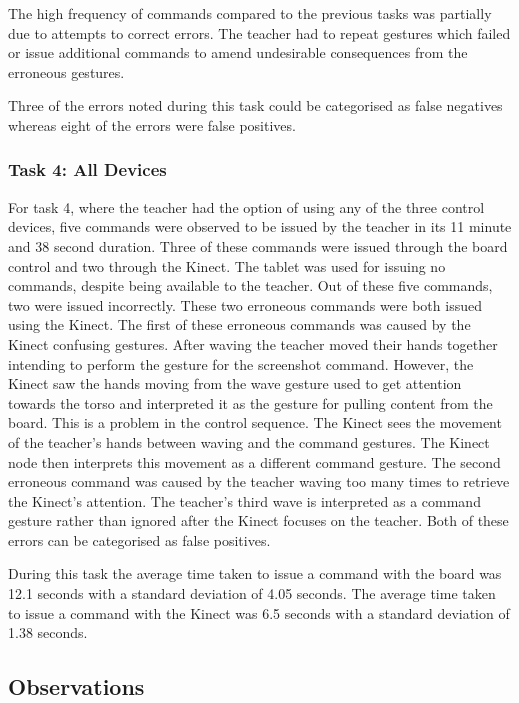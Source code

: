 \documentclass[link]{IWCOMP}
\begin{document}
The high frequency of commands compared to the previous tasks was partially due to attempts to correct errors.
The teacher had to repeat gestures which failed or issue additional commands to amend undesirable consequences from the erroneous gestures.

Three of the errors noted during this task could be categorised as false negatives whereas eight of the errors were false positives.

\subsubsection{Task 4: All Devices}
\label{subsubsec:pilotStudyResultsTask4}

For task 4, where the teacher had the option of using any of the three control devices, five commands were observed to be issued by the teacher in its 11 minute and 38 second duration.
Three of these commands were issued through the board control and two through the Kinect.
The tablet was used for issuing no commands, despite being available to the teacher.
Out of these five commands, two were issued incorrectly.
These two erroneous commands were both issued using the Kinect.
The first of these erroneous commands was caused by the Kinect confusing gestures.
After waving the teacher moved their hands together intending to perform the gesture for the screenshot command.
However, the Kinect saw the hands moving from the wave gesture used to get attention towards the torso and interpreted it as the gesture for pulling content from the board.
This is a problem in the control sequence.
The Kinect sees the movement of the teacher's hands between waving and the command gestures.
The Kinect node then interprets this movement as a different command gesture.
The second erroneous command was caused by the teacher waving too many times to retrieve the Kinect's attention.
The teacher's third wave is interpreted as a command gesture rather than ignored after the Kinect focuses on the teacher.
Both of these errors can be categorised as false positives.

During this task the average time taken to issue a command with the board was 12.1 seconds with a standard deviation of 4.05 seconds.
The average time taken to issue a command with the Kinect was 6.5 seconds with a standard deviation of 1.38 seconds.

\subsection{Observations}
\label{subsec:pilotdiscussion}
\end{document}

